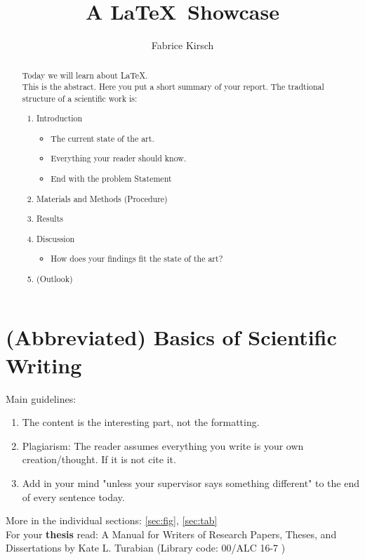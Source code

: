 \documentclass[]{article}
\title{A \LaTeX  \ Showcase}
\author{Fabrice Kirsch}
\begin{document}
\maketitle

\begin{abstract}
  Today we will learn about \LaTeX.\\
  This is the abstract. Here you put a short summary of your report.
  The tradtional structure of a scientific work is:
  \begin{enumerate}
    \item Introduction
          \begin{itemize}
            \item The current state of the art.
            \item Everything your reader should know.
            \item End with the problem Statement
          \end{itemize}
    \item Materials and Methods (Procedure)
    \item Results
    \item Discussion
          \begin{itemize}
            \item How does your findings fit the state of the art?
          \end{itemize}
    \item (Outlook)
  \end{enumerate}
\end{abstract}

\newpage
\tableofcontents



\section{(Abbreviated) Basics of Scientific Writing}
Main guidelines:
\begin{enumerate}
  \item The content is the interesting part, not the formatting.
  \item Plagiarism: The reader assumes everything you write is your own creation/thought. If it is not cite it.
  \item Add in your mind "unless your supervisor says something different" to the end of every sentence today.
\end{enumerate}
More in the individual sections: \autoref{sec:fig}, \autoref{sec:tab} \\
\noindent For your \textbf{thesis} read: A Manual for Writers of Research Papers, Theses, and
Dissertations by Kate L. Turabian (Library code: 00/ALC 16-7 ) \cite{turabian} \\
\end{document}
